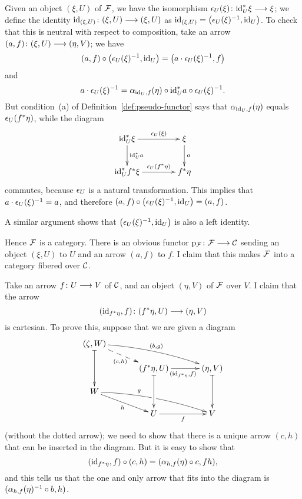 \begin{3   FIBERED CATEGORIES}
\begin{3.1 Fibered categories}
Given an object $(\xi, U)$ of $\mathcal{F}$, we have the isomorphism $\isoiden_U(\xi) \colon \id_U^* \xi \arr \xi$; we define the identity $\id_{(\xi,U)} \colon (\xi,U) \arr (\xi, U)$ as $\mathrm{id}_{(\xi,U)} = \bigl(\epsilon_U(\xi) ^{-1}, \mathrm{id}_U\bigr)$. To check that this is neutral with respect to composition, take an arrow $(a, f) \colon (\xi,U) \arr (\eta, V)$; we have 
   \[
   (a,f) \circ \bigl(\epsilon_U(\xi)^{-1}, \mathrm{id}_U\bigr) =
   \bigl(a \cdot \epsilon_U(\xi)^{-1}, f\bigr)
   \]
and
   \[
   a \cdot \epsilon_U(\xi)^{-1} = \alpha_{\mathrm{id}_U,f}(\eta)
   \circ \mathrm{id}_U^* a \circ \epsilon_U(\xi)^{-1}.
   \]
But condition~(a) of Definition~\ref{def:pseudo-functor} says that $\alpha_{\mathrm{id}_U,f}(\eta)$ equals $ \epsilon_U (f^* \eta)$, while the diagram
   \[
   \xymatrix@C+=40pt{
   {}\id_U^*\xi \ar[r]^-{\isoiden_U(\xi)} \ar[d]^{\id_U^*a} &
   {}\xi \ar[d]^{a}\\
   {}\id_U^*f^*\xi \ar[r]^-{\isoiden_U(f^*\eta)} &
   {}f^*\eta
   }
   \]
commutes, because $\epsilon_U$ is a natural transformation. This implies that $a \cdot \epsilon_U(\xi)^{-1} = a$, and therefore $(a,f) \circ \bigl(\epsilon_U(\xi)^{-1}, \mathrm{id}_U\bigr) = (a,f)$.

A similar argument shows that $\bigl(\epsilon_U(\xi)^{-1}, \mathrm{id}_U\bigr)$ is also a left identity.

Hence $\mathcal{F}$ is a category. There is an obvious functor $\p_{\cF} \colon \cF \arr \cC$ sending an object $(\xi, U)$ to $U$ and an arrow $(a,f)$ to $f$. I claim that this makes $\mathcal{F}$ into a category fibered over $\mathcal{C}$.

Take an arrow $f \colon U \arr V$ of $\mathcal{C}$, and an object $(\eta, V)$ of $\mathcal{F}$ over $V$. I claim that the arrow
   \[
   (\id_{f^*\eta}, f) \colon (f^*\eta, U) \arr
   (\eta, V)
   \]
is cartesian. To prove this, suppose that we are given a diagram
   \[
   \xymatrix@R-10pt@C+10pt{
   (\zeta,W) \ar@{|->}[dd] \ar@{-->}[rd]_{(c,h)}
   \ar@/^/[rrd]^{(b,g)} \\
   & (f^*\eta, U) \ar@{|->}[dd]\ar[r]_{(\id_{f^*\eta},f)}
   & (\eta,V) \ar@{|->}[dd] \\
   W\ar[rd]_h\ar@/^/[rrd]^<<<<<<<<g|(.4965)\hole\\
   & U \ar[r]_f
   & V
   }
   \]
(without the dotted arrow); we need to show that there is a unique arrow $(c,h)$ that can be inserted in the diagram. But it is easy to show that
   \[
   (\mathrm{id}_{f^*\eta},f) \circ (c,h) =
   (\alpha_{h,f}(\eta) \circ c, fh),
   \]
and this tells us that the one and only arrow that fits into the diagram is $(\alpha_{h,f}(\eta)^{-1} \circ b, h)$.


\end{3.1 Fibered categories}
\end{3   FIBERED CATEGORIES}
